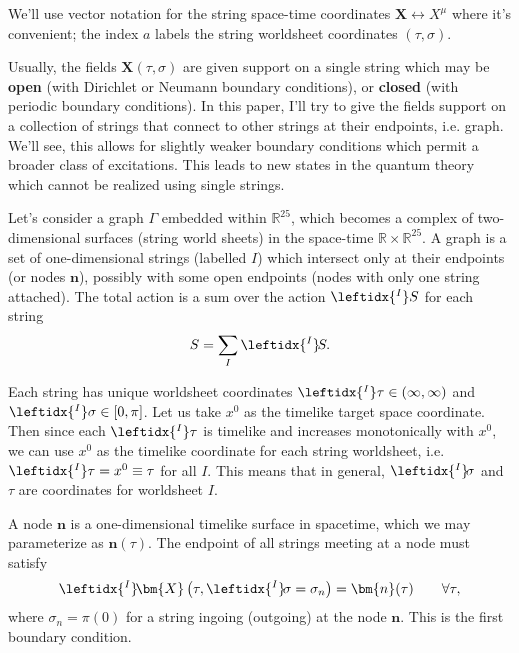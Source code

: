 \documentclass{article}
\newcommand{\be}{\begin{eqnarray}}
\newcommand{\ee}{\end{eqnarray}}
\def\X{\bm{X}}
\def\n{\bm{n}}
\def\lI{\leftidx{^I} \! }
\begin{document}
We'll use vector notation for the string space-time coordinates $\X \leftrightarrow X^\mu$ where it's convenient; the index $a$ labels the string worldsheet coordinates $(\tau, \sigma)$.

Usually, the fields $\X(\tau, \sigma)$ are given support on a single string which may be \textbf{open} (with Dirichlet or Neumann boundary conditions), or \textbf{closed} (with periodic boundary conditions). In this paper, I'll try to  give the fields support on a collection of strings that connect to other strings at their endpoints, i.e. graph. We'll see, this allows for slightly weaker boundary conditions which permit a broader class of excitations. This leads to new states in the quantum theory which cannot be realized using single strings.

Let's consider a graph $\Gamma$ embedded within $\mathbb{R}^{25}$, which becomes a complex of two-dimensional surfaces (string world sheets) in the space-time $\mathbb{R} \times \mathbb{R}^{25}$. A graph is a set of one-dimensional strings (labelled $I$) which intersect only at their endpoints (or nodes $\n$), possibly with some open endpoints (nodes with only one string attached). The total action is a sum over the action $ \leftidx{^I}S$ for each string
\be
S = \sum_I \lI S.
\ee

Each string has unique worldsheet coordinates $\leftidx{^I}\tau \in (\infty, \infty)$ and $\leftidx{^I}\sigma \in [0, \pi]$. Let us take $x^0$ as the timelike target space coordinate. Then since each $\leftidx{^I}\tau$ is timelike and increases monotonically with $x^0$, we can use $x^0$ as the timelike coordinate for each string worldsheet, i.e. $\leftidx{^I}\tau = x^0 \equiv \tau$ for all $I$. This means that in general, $\lI \sigma$ and $\tau$ are coordinates for worldsheet $I$.

A node $\n$ is a one-dimensional timelike surface in spacetime, which we may parameterize as $\n(\tau)$. The endpoint of all strings meeting at a node must satisfy
\be
\label{BC1}
\lI \X \left( \tau, \lI \sigma = \sigma_n \right) = \n(\tau) \qquad \forall \tau, 
\ee
where $\sigma_n = \pi (0)$ for a string ingoing (outgoing) at the node $\n$. This is the first boundary condition.
\end{document}

